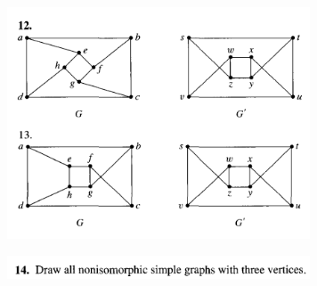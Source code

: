 \documentclass{article}
\begin{document}
\begin{figure}
\centering
\includegraphics[width=90mm]{9}
\end{figure}

\begin{figure}
\centering
\includegraphics[width=90mm]{10}
\end{figure}
\end{document}
